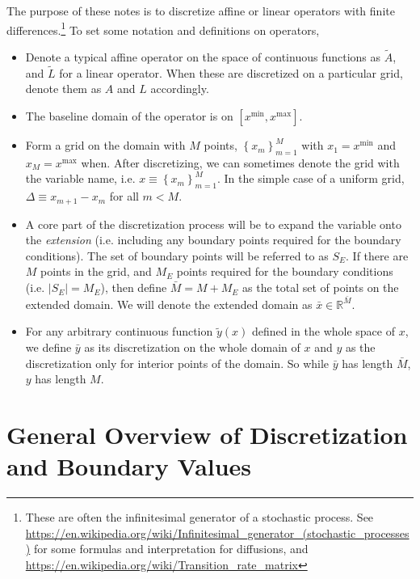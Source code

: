 \documentclass[11pt]{article}
\newcommand{\set}[1]{\ensuremath{\left\{{#1}\right\}}}
\newcommand{\R}{\ensuremath{\mathbb{R}}}
\begin{document}
	The purpose of these notes is to discretize affine or linear operators with finite differences.\footnote{These are often the infinitesimal generator of a stochastic process.  See \url{https://en.wikipedia.org/wiki/Infinitesimal_generator_(stochastic_processes)} for some formulas and interpretation for diffusions, and \url{https://en.wikipedia.org/wiki/Transition_rate_matrix}} To set some notation and definitions on operators,
	\begin{itemize}
		\item Denote a typical affine operator on the space of continuous functions as $\tilde{A}$, and $\tilde{L}$ for a linear operator.  When these are discretized on a particular grid, denote them as $A$ and $L$ accordingly.
		\item The baseline domain of the operator is on $[x^{\min}, x^{\max}]$.
		\item Form a grid on the domain with $M$ points, $\set{x_m}_{m=1}^{M}$ with $x_1 = x^{\min}$ and $x_{M} = x^{\max}$ when. After discretizing, we can sometimes denote the grid with the variable name, i.e. $x \equiv \set{x_m}_{m=1}^M$. In the simple case of a uniform grid, $\Delta \equiv x_{m+1} - x_m$ for all $m < M$.
		\item A core part of the discretization process will be to expand the variable onto the \textit{extension} (i.e. including any boundary points required for the boundary conditions). The set of boundary points will be referred to as $S_E$. If there are $M$ points in the grid, and $M_E$ points required for the boundary conditions (i.e. $|S_E| = M_E$), then define $\bar{M} = M + M_E$ as the total set of points on the extended domain. We will denote the extended domain as $\bar{x} \in \R^{\bar{M}}$.
		\item For any arbitrary continuous function $\tilde{y}(x)$ defined in the whole space of $x$, we define $\bar{y}$ as its discretization on the whole domain of $x$ and $y$ as the discretization only for interior points of the domain. So while $\bar{y}$ has length $\bar{M}$, $y$ has length $M$.
	\end{itemize}

\section{General Overview of Discretization and Boundary Values}\label{sec:general}
\end{document}

